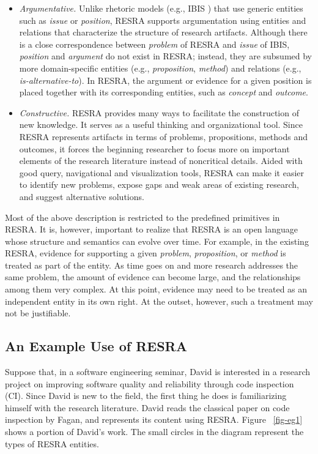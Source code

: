 \begin{itemize}
\item {\it Argumentative.\/} Unlike rhetoric models (e.g., IBIS
  \cite{Conklin88Gibis}) that use generic entities such as {\it issue\/} or
  {\it position\/}, RESRA supports argumentation using entities and
  relations that characterize the structure of research artifacts. Although
  there is a close correspondence between {\it problem\/} of RESRA and {\it
  issue\/} of IBIS, {\it position\/} and {\it argument\/} do not exist in
  RESRA; instead, they are subsumed by more domain-specific entities (e.g.,
  {\it proposition\/}, {\it method\/}) and relations (e.g., {\it
  is-alternative-to\/}). In RESRA, the argument or evidence for a given
  position is placed together with its corresponding entities, such as {\it
  concept\/} and {\it outcome\/}.
  
\item {\it Constructive.\/} RESRA provides many ways to facilitate the
  construction of new knowledge. It serves as a useful thinking and
  organizational tool. Since RESRA represents artifacts in terms of
  problems, propositions, methods and outcomes, it forces the beginning
  researcher to focus more on important elements of the research literature
  instead of noncritical details. Aided with good query, navigational and
  visualization tools, RESRA can make it easier to identify new problems,
  expose gaps and weak areas of existing research, and suggest alternative
  solutions.
\end{itemize}

Most of the above description is restricted to the predefined primitives in
RESRA. It is, however, important to realize that RESRA is an open language
whose structure and semantics can evolve over time.  For example, in the
existing RESRA, evidence for supporting a given {\it problem}, {\it
proposition}, or {\it method \/} is treated as part of the entity. As time
goes on and more research addresses the same problem, the amount of
evidence can become large, and the relationships among them very complex.
At this point, evidence may need to be treated as an independent entity in
its own right. At the outset, however, such a treatment may not be
justifiable.


\subsection{An Example Use of RESRA}

Suppose that, in a software engineering seminar, David is interested in a
research project on improving software quality and reliability through code
inspection (CI). Since David is new to the field, the first thing he does
is familiarizing himself with the research literature. David reads the
classical paper on code inspection by Fagan, and represents its content
using RESRA. Figure ~\ref{fig-eg1} shows a portion of David's work. The
small circles in the diagram represent the types of RESRA entities.

